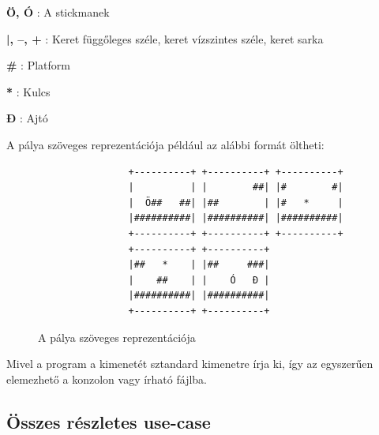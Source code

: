 	    \begin{description}
	        \newcommand{\frameitem}[1]{\item{\textbf{#1}} }
	        \frameitem{Ö, Ó}: A stickmanek
	        \frameitem{|, --, +}: Keret függőleges széle, keret vízszintes széle, keret sarka
	        \frameitem{\#}: Platform
	        \frameitem{*}: Kulcs
	        \frameitem{Đ}: Ajtó
        \end{description}

        A pálya szöveges reprezentációja például az alábbi formát öltheti:
        
		\begin{figure}[hb]
		  \begin{center}
		\begin{verbatim}
                +----------+ +----------+ +----------+
                |          | |        ##| |#        #|
                |  Ö##   ##| |##        | |#   *     |
                |##########| |##########| |##########|
                +----------+ +----------+ +----------+
                +----------+ +----------+
                |##   *    | |##     ###|
                |    ##    | |    Ó   Đ |
                |##########| |##########|
                +----------+ +----------+
		\end{verbatim}
		  \caption{A pálya szöveges reprezentációja}
		  \end{center}
		\end{figure}        
        
        Mivel a program a kimenetét sztandard kimenetre írja ki, így az egyszerűen elemezhető a konzolon vagy írható fájlba.
	
	\subsection{Összes részletes use-case}
        \newcommand{\ucitem}[1]{\item \textbf{Név: #1}\\}
        \newcommand{\ucdesc}[1]{\textbf{Rövid leírás: } #1\\}
        \newcommand{\ucact}[1]{\textbf{Actor: } #1\\}
        \newcommand{\ucscenario}[1]{\textbf{Forgatókönyv: }#1\\}
        \newcommand{\uccommand}[1]{\textbf{Parancs: }#1\\}
        
